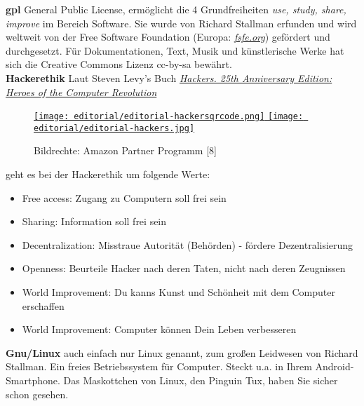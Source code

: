\textbf{gpl} General Public License, ermöglicht die 4 Grundfreiheiten \emph{use, study, share, improve} im Bereich Software. Sie wurde von Richard Stallman erfunden und wird weltweit von der Free Software Foundation (Europa: \href{http://fsfe.org/}{\textit{fsfe.org}}) gefördert und durchgesetzt. Für Dokumentationen, Text, Musik und künstlerische Werke hat sich die Creative Commons Lizenz cc-by-sa bewährt. \\

\textbf{Hackerethik} Laut Steven Levy's Buch \href{http://www.amazon.de/gp/product/1449388396/ref=as_li_ss_tl?ie=UTF8&camp=1638&creative=19454&creativeASIN=1449388396&linkCode=as2&tag=spielendprogr-21}{\textit{Hackers. 25th Anniversary Edition: Heroes of the Computer Revolution}}\\ 
\begin{figure}
\href{http://www.amazon.de/gp/product/1449388396/ref=as_li_ss_tl?ie=UTF8&camp=1638&creative=19454&creativeASIN=1449388396&linkCode=as2&tag=spielendprogr-21}{
\texttt{[image: editorial/editorial-hackersqrcode.png]} 
\texttt{[image: editorial/editorial-hackers.jpg]}}\\
\caption{Bildrechte: Amazon Partner Programm [8]}
\end{figure}
geht es bei der Hackerethik um folgende Werte:
\begin{itemize}
\item Free access: Zugang zu Computern soll frei sein
\item Sharing: Information soll frei sein
\item Decentralization: Misstraue Autorität (Behörden) - fördere Dezentralisierung
\item Openness: Beurteile Hacker nach deren Taten, nicht nach deren Zeugnissen
\item World Improvement: Du kanns Kunst und Schönheit mit dem Computer erschaffen
\item World Improvement: Computer können Dein Leben verbesseren
\end{itemize}

\textbf{Gnu/Linux} auch einfach nur Linux genannt, zum großen Leidwesen von Richard Stallman. Ein freies Betriebssystem für Computer. Steckt u.a. in Ihrem Android-Smartphone. Das Maskottchen von Linux, den Pinguin Tux, haben Sie sicher schon gesehen. \\

